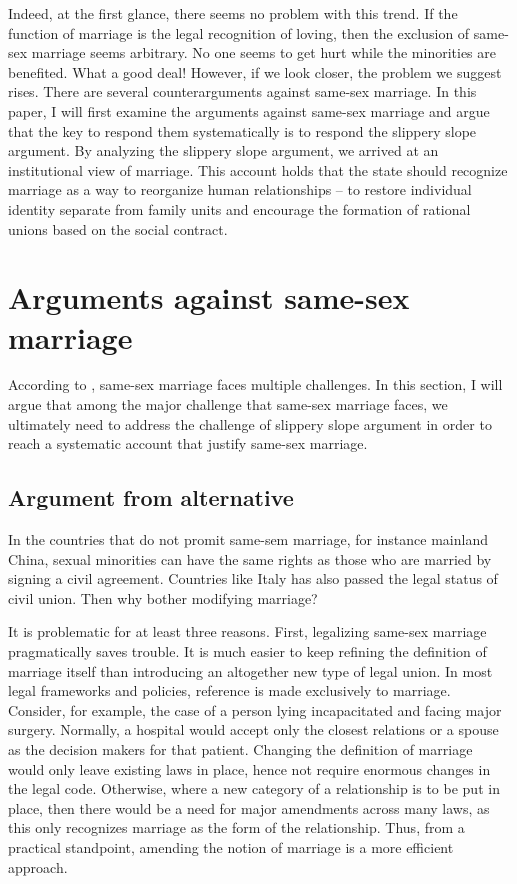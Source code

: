 \documentclass{article}
\begin{document}
Indeed, at the first glance, there seems no problem with this trend. If the function of marriage is the legal recognition of loving, then the exclusion of same-sex marriage seems arbitrary. No one seems to get hurt while the minorities are benefited. What a good deal! However, if we look closer, the problem we suggest rises. There are several counterarguments against same-sex marriage. In this paper, I will first examine the arguments against same-sex marriage and argue that the key to respond them systematically is to respond the slippery slope argument. By analyzing the slippery slope argument, we arrived at an institutional view of marriage. This account holds that the state should recognize marriage as a way to reorganize human relationships -- to restore individual identity separate from family units and encourage the formation of rational unions based on the social contract.

\section{Arguments against same-sex marriage}

According to \textcite{brakeMarriageDomesticPartnership2023}, same-sex marriage faces multiple challenges. In this section, I will argue that among the major challenge that same-sex marriage faces,  we ultimately need to address the challenge of slippery slope argument in order to reach a systematic account that justify same-sex marriage.

\subsection{Argument from alternative}
\label{alternative}

In the countries that do not promit same-sem marriage, for instance mainland China, sexual minorities can have the same rights as those who are married by signing a civil agreement. Countries like Italy has also passed the legal status of civil union.\autocite{povoledoItalyApprovesSameSex2016} Then why bother modifying marriage? 

It is problematic for at least three reasons. First, legalizing same-sex marriage pragmatically saves trouble. It is much easier to keep refining the definition of marriage itself than introducing an altogether new type of legal union. In most legal frameworks and policies, reference is made exclusively to marriage. Consider, for example, the case of a person lying incapacitated and facing major surgery. Normally, a hospital would accept only the closest relations or a spouse as the decision makers for that patient. Changing the definition of marriage would only leave existing laws in place, hence not require enormous changes in the legal code. Otherwise, where a new category of a relationship is to be put in place, then there would be a need for major amendments across many laws, as this only recognizes marriage as the form of the relationship. Thus, from a practical standpoint, amending the notion of marriage is a more efficient approach. 
\end{document}

